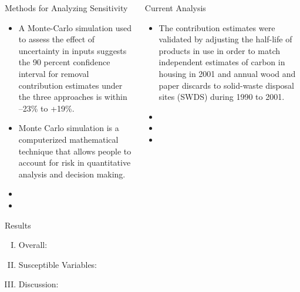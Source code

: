 \documentclass[final]{beamer}\usepackage[]{graphicx}\usepackage[]{color}
\begin{document}
\begin{frame}[fragile]
\begin{columns}[t]
\begin{column}{0.23\linewidth}
\begin{minipage}[t][.955\textheight]{\linewidth}
\begin{block}{Methods for Analyzing Sensitivity}
\begin{itemize}
\item A Monte-Carlo simulation used to assess the effect of uncertainty in inputs suggests the 90 percent confidence interval for removal contribution estimates under the three approaches is within –23\% to +19\%.
\vspace{2ex}
\item Monte Carlo simulation is a computerized mathematical technique that allows people to account for risk in quantitative analysis and decision making.
\item
\item
\end{itemize}
\vspace{0ex}
\vfill
\end{block}
\vfill

\begin{block}{Results}

\begin{enumerate}[I.]
\item Overall:


\item Susceptible Variables:


\item Discussion:


\end{enumerate}
\vspace{0ex}

\end{block}
\vfill


\end{minipage}
\end{column}%


\begin{column}{0.23\linewidth}
\begin{minipage}[t][.955\textheight]{\linewidth} 

\vspace{0ex}
\begin{block}{Current Analysis}
\vspace{0ex}
\begin{itemize}
\item The contribution estimates were validated by adjusting the half-life of products in use in order to match independent estimates of carbon in housing in 2001 and annual wood and paper discards to solid-waste disposal sites (SWDS) during 1990 to 2001. 
\item
\item
\item
\end{itemize}
\vspace{0ex}
\end{block}
\vfill


\end{minipage}
\end{column}
\end{columns}
\end{frame}
\end{document}
